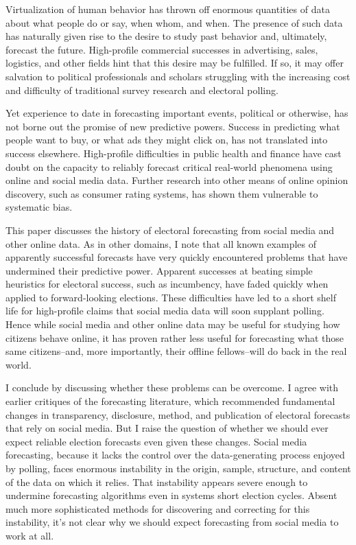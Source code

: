 \documentclass{article}
\begin{document}
Virtualization of human behavior has thrown off enormous quantities of
data about what people do or say, when whom, and when. The presence of
such data has naturally given rise to the desire to study past behavior and,
ultimately, forecast the future. High-profile commercial successes in
advertising, sales, logistics, and other fields hint that this desire
may be fulfilled. If so, it may offer salvation to political
professionals and scholars struggling with the increasing cost and
difficulty of traditional survey research and electoral polling.

Yet experience to date in forecasting important events, political or
otherwise, has not borne out the promise of new predictive
powers. Success in predicting what people want to buy, or what ads
they might click on, has not translated into success
elsewhere. High-profile difficulties in public health and finance have
cast doubt on the capacity to reliably forecast critical real-world
phenomena using online and social media data. Further research into
other means of online opinion discovery, such as consumer rating
systems, has shown them vulnerable to systematic bias.

This paper discusses the history of electoral forecasting from social
media and other online data. As in other domains, I note that all
known examples of apparently successful forecasts have very quickly
encountered problems that have undermined their predictive
power. Apparent successes at beating simple heuristics for electoral
success, such as incumbency, have faded quickly when applied to
forward-looking elections. These difficulties have led to a short
shelf life for  high-profile claims that social media data
will soon supplant polling. Hence while
social media and other online data may be useful for studying how
citizens behave online, it has proven rather less useful for
forecasting what those same citizens--and, more importantly, their
offline fellows--will do back in the real world.

I conclude by discussing whether these problems can be overcome. I
agree with earlier critiques of the forecasting literature, which
recommended fundamental changes in transparency, disclosure, method, and
publication of electoral forecasts that rely on social media. But I
raise the question of whether we should ever expect reliable election
forecasts even given these changes. Social media forecasting, because
it lacks the control over the data-generating process enjoyed by
polling, faces enormous instability in the origin, sample, structure,
and content of the data on which it relies. That instability appears
severe enough to undermine forecasting algorithms even in systems
short election cycles. Absent much more sophisticated methods for
discovering and correcting for this instability, it's not clear why we
should expect forecasting from social media to work at all. 
\end{document}
